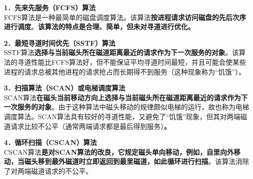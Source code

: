 \textbf{{1．先来先服务（FCFS）算法}}\\

FCFS算法是一种最简单的磁盘调度算法。该算法{\textbf{按进程请求访问磁盘的先后次序进行调度}}。\textbf{该算法的特点是合理、简单，但未对寻道进行优化。}

\textbf{{2．最短寻道时间优先（SSTF）算法}}\\

SSTF算法{\textbf{选择与当前磁头所在磁道距离最近的请求作为下一次服务的对象}}。该算法的寻道性能比FCFS算法好，但不能保证平均寻道时间最短，并且可能会使某些进程的请求总被其他进程的请求抢占而长期得不到服务（这种现象称为``饥饿''）。

\textbf{{3．扫描算法（SCAN）或电梯调度算法}}\\

SCAN算法{\textbf{在磁头当前移动方向上选择与当前磁头所在磁道距离最近的请求作为下一次服务的对象}}。由于这种算法中磁头移动的规律颇似电梯的运行，故也称为电梯调度算法。SCAN算法具有较好的寻道性能，又避免了``饥饿''现象，但其对两端磁道请求比较不公平（通常两端请求都是最后得到服务）\textbf{。}

\textbf{{4．循环扫描（CSCAN）算法}}\\
CSCAN算法{\textbf{是对SCAN算法的改良，它规定磁头单向移动，例如，自里向外移动，当磁头移到最外磁道时立即返回到最里磁道，如此循环进行扫描}}。该算法消除了对两端磁道请求的不公平。
